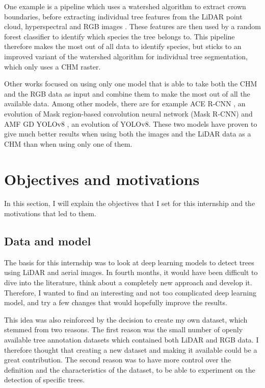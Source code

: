 \documentclass[
  letterpaper,
  DIV=11,
  numbers=noendperiod]{scrartcl}
\begin{document}
One example is a pipeline which uses a watershed algorithm to extract
crown boundaries, before extracting individual tree features from the
LiDAR point cloud, hyperspectral and RGB images
\autocite{lidar_rgb_wst}. These features are then used by a random
forest classifier to identify which species the tree belongs to. This
pipeline therefore makes the most out of all data to identify species,
but sticks to an improved variant of the watershed algorithm for
individual tree segmentation, which only uses a CHM raster.

Other works focused on using only one model that is able to take both
the CHM and the RGB data as input and combine them to make the most out
of all the available data. Among other models, there are for example ACE
R-CNN \autocite{lidar_rgb_acnet}, an evolution of Mask region-based
convolution neural network (Mask R-CNN) and AMF GD YOLOv8
\autocite{amf_gd_yolov8}, an evolution of YOLOv8. These two models have
proven to give much better results when using both the images and the
LiDAR data as a CHM than when using only one of them.

\section{Objectives and motivations}\label{objectives-and-motivations}

In this section, I will explain the objectives that I set for this
internship and the motivations that led to them.

\subsection{Data and model}\label{data-and-model}

The basis for this internship was to look at deep learning models to
detect trees using LiDAR and aerial images. In fourth months, it would
have been difficult to dive into the literature, think about a
completely new approach and develop it. Therefore, I wanted to find an
interesting and not too complicated deep learning model, and try a few
changes that would hopefully improve the results.

This idea was also reinforced by the decision to create my own dataset,
which stemmed from two reasons. The first reason was the small number of
openly available tree annotation datasets which contained both LiDAR and
RGB data. I therefore thought that creating a new dataset and making it
available could be a great contribution. The second reason was to have
more control over the definition and the characteristics of the dataset,
to be able to experiment on the detection of specific trees.
\end{document}
